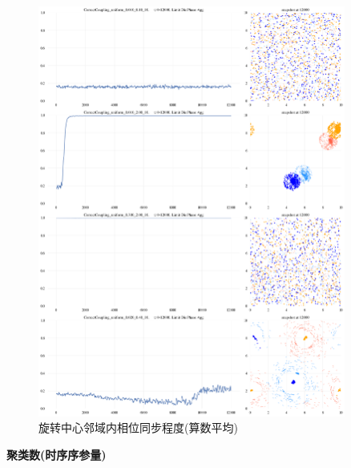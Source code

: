 \documentclass{article}
\begin{document}
\begin{figure}[H]
	\centering
	\includegraphics[width=0.9\textwidth]{./figs/limitDisPhaseSyncOp_ts.png}
	\caption{旋转中心邻域内相位同步程度(算数平均)}
	\label{fig:fig234t.3}
\end{figure}

\newpage
\noindent\textbf{聚类数(时序序参量)}
\end{document}

